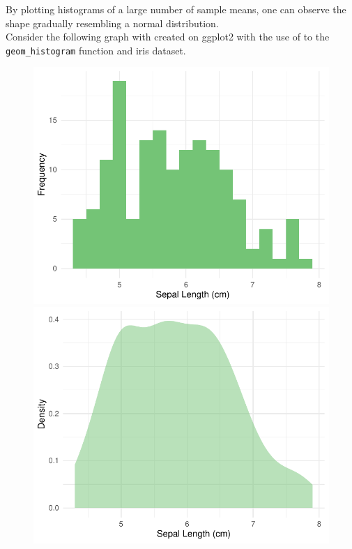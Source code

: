 \documentclass{article}\usepackage[]{graphicx}\usepackage[]{xcolor}
\newenvironment{knitrout}{}{} %
\numberwithin{equation}{section}
\begin{document}
\noindent By plotting histograms of a large number of sample means, one can observe the shape gradually resembling a normal distribution.\\

\noindent
Consider the following graph with created on ggplot2 with the use of to the \texttt{geom\_histogram} function and iris dataset.

\begin{figure}[htbp]
  \centering
  \begin{minipage}[b]{0.48\linewidth}
\begin{knitrout}\scriptsize
{}\color{fgcolor}

{\centering \includegraphics[width=\linewidth]{figure/beamer-hist2-1} 

}


\end{knitrout}
  \end{minipage}
  \hfill
  \begin{minipage}[b]{0.48\linewidth}
\begin{knitrout}\scriptsize
{}\color{fgcolor}

{\centering \includegraphics[width=\linewidth]{figure/beamer-kde3-1} 

}
\end{knitrout}
\end{minipage}
\end{figure}
\end{document}
